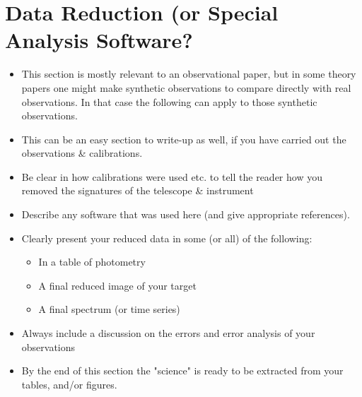 \documentclass[twocolumn]{aastex61}
\begin{document}
\section{Data Reduction (or Special Analysis Software?}
\begin{itemize}\itemsep0em
\item This section is mostly relevant to an observational paper, but in some theory papers one might make synthetic observations to compare directly with real observations.  In that case the following can apply to those synthetic observations.
\item This can be an easy section to write-up as well, if you have carried out the observations \& calibrations.
\item Be clear in how calibrations were used etc. to tell the reader how you removed the signatures of the telescope \& instrument 
\item Describe any software that was used here (and give appropriate references).
\item Clearly present your reduced data in some (or all) of the following:
\begin{itemize}\itemsep0em
\item In a table of photometry
\item A final reduced image of your target
\item A final spectrum (or time series) 
\end{itemize}
\item Always include a discussion on the errors and error analysis of your observations
\item By the end of this section the "science" is ready to be extracted from your tables, and/or figures.
\end{itemize}
\end{document}
